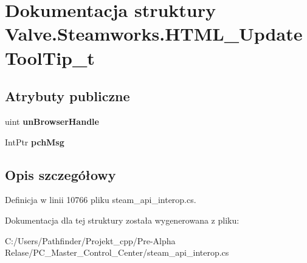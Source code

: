 \hypertarget{struct_valve_1_1_steamworks_1_1_h_t_m_l___update_tool_tip__t}{}\section{Dokumentacja struktury Valve.\+Steamworks.\+H\+T\+M\+L\+\_\+\+Update\+Tool\+Tip\+\_\+t}
\label{struct_valve_1_1_steamworks_1_1_h_t_m_l___update_tool_tip__t}
\subsection*{Atrybuty publiczne}
\begin{DoxyCompactItemize}
\item 
\mbox{\label{struct_valve_1_1_steamworks_1_1_h_t_m_l___update_tool_tip__t_ade25a36919bff489ff86daefa4b35f29}} 
uint {\bfseries un\+Browser\+Handle}
\item 
\mbox{\label{struct_valve_1_1_steamworks_1_1_h_t_m_l___update_tool_tip__t_ac837ce76280131bf136214103dab2af2}} 
Int\+Ptr {\bfseries pch\+Msg}
\end{DoxyCompactItemize}


\subsection{Opis szczegółowy}


Definicja w linii 10766 pliku steam\+\_\+api\+\_\+interop.\+cs.



Dokumentacja dla tej struktury została wygenerowana z pliku\+:\begin{DoxyCompactItemize}
\item 
C\+:/\+Users/\+Pathfinder/\+Projekt\+\_\+cpp/\+Pre-\/\+Alpha Relase/\+P\+C\+\_\+\+Master\+\_\+\+Control\+\_\+\+Center/steam\+\_\+api\+\_\+interop.\+cs\end{DoxyCompactItemize}
